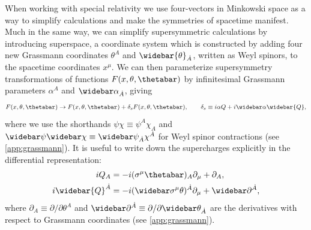 When working with special relativity we use four-vectors in Minkowski space as a way to simplify calculations and make the symmetries of spacetime manifest.
Much in the same way, we can simplify supersymmetric calculations by introducing superspace, a coordinate system which is constructed by adding four new Grassmann coordinates $\theta^A$ and $\widebar{\theta}_{\dot{A}}$, written as Weyl spinors, to the spacetime coordinates $x^\mu$.
We can then parameterize supersymmetry transformations of functions $F(x,\theta,\thetabar)$ by infinitesimal Grassmann parameters $\alpha^A$ and $\widebar\alpha_{\dot{A}}$, giving
\begin{equation}\label{eq:susy_transformation}
    F(x,\theta,\thetabar) \to F(x,\theta,\thetabar) + \delta_s F(x,\theta,\thetabar),
    \qquad
    \delta_s \equiv i\alpha Q + i\widebar\alpha\widebar{Q},
\end{equation}
where we use the shorthands $\psi\chi\equiv\psi^A\chi_A$ and $\widebar\psi\widebar\chi\equiv\widebar\psi_{\dot{A}}\chi^{\dot{A}}$ for Weyl spinor contractions (see \cref{app:grassmann}).
It is useful to write down the supercharges explicitly in the differential representation:
\begin{subequations}
\label{eq:supercharge_differential}
\begin{align}
    iQ_A &= -i(\sigma^\mu\thetabar)_A \partial_\mu + \partial_A,
    \\
    i\widebar{Q}^{\dot{A}} &= -i(\widebar\sigma^\mu\theta)^{\dot{A}} \partial_\mu + \widebar\partial^{\dot{A}},
\end{align}
\end{subequations}
where $\partial_A \equiv \partial/\partial\theta^A$ and $\widebar\partial^{\dot{A}} \equiv \partial/\partial\widebar\theta_{\dot{A}}$ are the derivatives with respect to Grassmann coordinates (see \cref{app:grassmann}).
